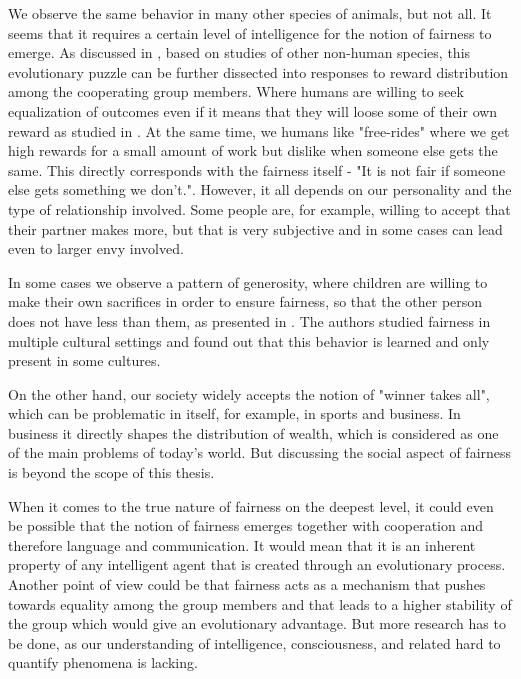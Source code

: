 We observe the same behavior in many other species of animals, but not all. It seems that it requires a certain level of intelligence for the notion of fairness to emerge. As discussed in \cite{brosnan2014evolution}, based on studies of other non-human species, this evolutionary puzzle can be further dissected into responses to reward distribution among the cooperating group members. Where humans are willing to seek equalization of outcomes even if it means that they will loose some of their own reward as studied in \cite{willing_to_pay_to_equality}. At the same time, we humans like "free-rides" where we get high rewards for a small amount of work but dislike when someone else gets the same. This directly corresponds with the fairness itself - "It is not fair if someone else gets something we don't.". However, it all depends on our personality and the type of relationship involved. Some people are, for example, willing to accept that their partner makes more, but that is very subjective and in some cases can lead even to larger envy involved.

In some cases we observe a pattern of generosity, where children are willing to make their own sacrifices in order to ensure fairness, so that the other person does not have less than them, as presented in \cite{children_generocity_blake}. The authors studied fairness in multiple cultural settings and found out that this behavior is learned and only present in some cultures.

On the other hand, our society widely accepts the notion of "winner takes all", which can be problematic in itself, for example, in sports and business. In business it directly shapes the distribution of wealth, which is considered as one of the main problems of today's world. But discussing the social aspect of fairness is beyond the scope of this thesis.

When it comes to the true nature of fairness on the deepest level, it could even be possible that the notion of fairness emerges together with cooperation and therefore language and communication. It would mean that it is an inherent property of any intelligent agent that is created through an evolutionary process.
Another point of view could be that fairness acts as a mechanism that pushes towards equality among the group members and that leads to a higher stability of the group which would give an evolutionary advantage.
But more research has to be done, as our understanding of intelligence, consciousness, and related hard to quantify phenomena is lacking.\newline

